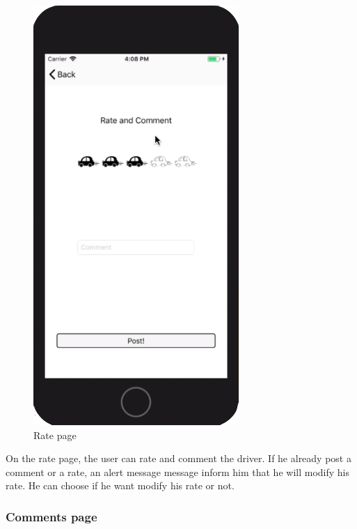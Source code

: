 \begin{figure}[h!]
\begin{center}
\includegraphics[scale = 0.3]{diagrams/RatePage} 
\end{center}
\caption{Rate page}
\end{figure}

On the rate page, the user can rate and comment the driver. If he already post a comment or a rate, an alert message message inform him that he will modify his rate. He can choose if he want modify his rate or not.

\subsubsection{Comments page}

